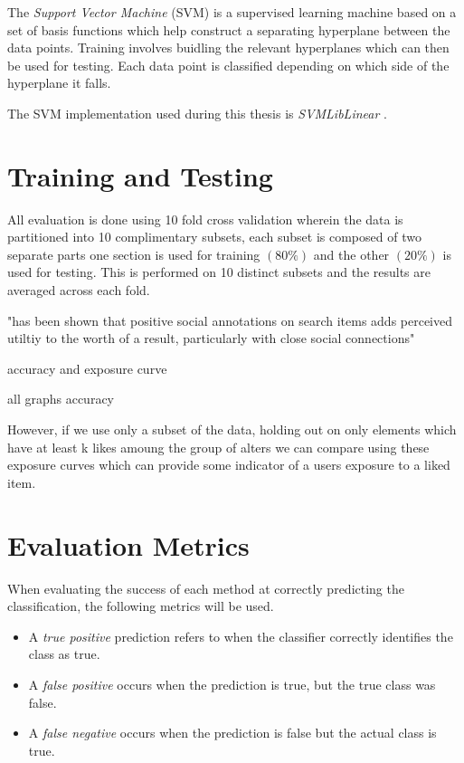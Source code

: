 The \emph{Support Vector Machine} (SVM) is a supervised learning machine based on a set of basis functions which help construct a separating 
hyperplane between the data points. Training involves buidling the relevant hyperplanes which can then be used for testing. Each data point is
classified depending on which side of the hyperplane it falls.

The SVM implementation used during this thesis is \emph{SVMLibLinear} \cite{cjlin}.

\section{Training and Testing}
\label{sec:tt}

All evaluation is done using 10 fold cross validation wherein the data is partitioned into 10 complimentary subsets, each subset is composed 
of two separate parts one section is used for training $(80\%)$ and the other $(20\%)$ is used for testing. This is performed on 10 distinct 
subsets and the results are averaged across each fold.

"has been shown that positive social annotations on search items adds perceived utiltiy to the worth of a result, particularly with close social
connections"
~\cite{pantel}

accuracy and exposure curve

all graphs accuracy

However, if we use only a subset of the data, holding out on only elements which have at least k likes amoung the group of alters 
we can compare using these exposure curves  which can provide some indicator of a users exposure to a liked item.

\section{Evaluation Metrics}
\label{sec:notation}

When evaluating the success of each method at correctly predicting the classification, the following metrics will be used.

\begin{itemize}
\item A \emph{true positive} prediction refers to when the classifier correctly identifies the class as true. 
\item A \emph{false positive} occurs when the prediction is true, but the true class was false. 
\item A \emph{false negative} occurs when the prediction is false but the actual class is true.
\end{itemize}

